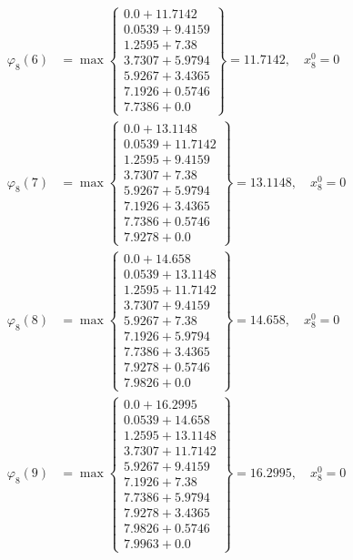 \documentclass{article}
\begin{document}
\begin{align*}
  
  
  
\varphi_{8}(6) &= \max \left\{ \begin{array}{c}
0.0 + 11.7142 \\
 0.0539 + 9.4159 \\
 1.2595 + 7.38 \\
 3.7307 + 5.9794 \\
 5.9267 + 3.4365 \\
 7.1926 + 0.5746 \\
 7.7386 + 0.0
\end{array} \right\}=11.7142,\quad x_{8}^0=0\\
  
  
  
  
\varphi_{8}(7) &= \max \left\{ \begin{array}{c}
0.0 + 13.1148 \\
 0.0539 + 11.7142 \\
 1.2595 + 9.4159 \\
 3.7307 + 7.38 \\
 5.9267 + 5.9794 \\
 7.1926 + 3.4365 \\
 7.7386 + 0.5746 \\
 7.9278 + 0.0
\end{array} \right\}=13.1148,\quad x_{8}^0=0\\
  
  
  
  
\varphi_{8}(8) &= \max \left\{ \begin{array}{c}
0.0 + 14.658 \\
 0.0539 + 13.1148 \\
 1.2595 + 11.7142 \\
 3.7307 + 9.4159 \\
 5.9267 + 7.38 \\
 7.1926 + 5.9794 \\
 7.7386 + 3.4365 \\
 7.9278 + 0.5746 \\
 7.9826 + 0.0
\end{array} \right\}=14.658,\quad x_{8}^0=0\\
  
  
  
  
\varphi_{8}(9) &= \max \left\{ \begin{array}{c}
0.0 + 16.2995 \\
 0.0539 + 14.658 \\
 1.2595 + 13.1148 \\
 3.7307 + 11.7142 \\
 5.9267 + 9.4159 \\
 7.1926 + 7.38 \\
 7.7386 + 5.9794 \\
 7.9278 + 3.4365 \\
 7.9826 + 0.5746 \\
 7.9963 + 0.0
\end{array} \right\}=16.2995,\quad x_{8}^0=0\\
  

\end{align*}
\end{document}
